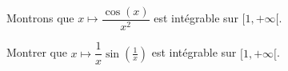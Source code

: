 \documentclass[french,11pt,twoside]{VcCours}
\newcommand{\dt}{\text{d}t}
\begin{document}
\begin{Demonstration}{}
%

\vspace{10cm}

%
\end{Demonstration}
\newpage

\begin{Exemple} Montrons que $x \mapsto \dfrac{\cos(x)}{x^2}$ est intégrable sur $[1,+ \infty[$.

\vspace{4cm}
\end{Exemple}

\begin{ApplicationDirecte}{} Montrer que $x \mapsto \dfrac{1}{x} \sin \left( \frac{1}{x} \right)$ est intégrable sur $[1,+ \infty[$.
\end{ApplicationDirecte} 
\end{document}
